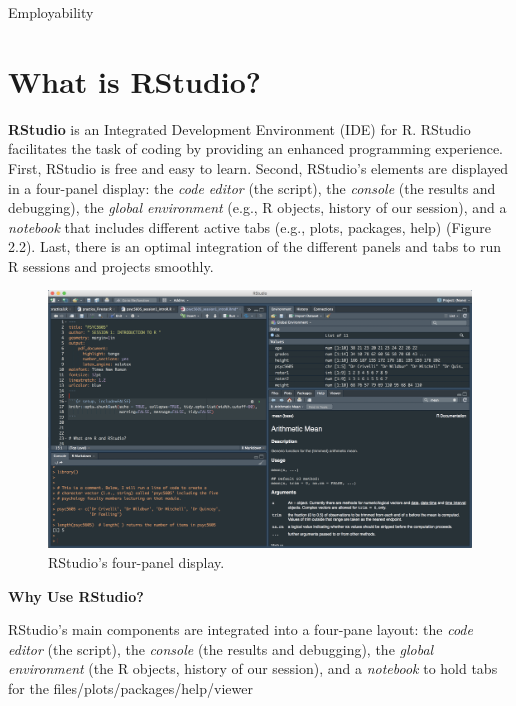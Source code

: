 \documentclass[
]{book}
\theoremstyle{definition}
\theoremstyle{definition}
\theoremstyle{definition}
\theoremstyle{definition}
\theoremstyle{remark}
\begin{document}
Employability

\hypertarget{what-is-rstudio}{%
\section{What is RStudio?}\label{what-is-rstudio}}

\textbf{RStudio} is an Integrated Development Environment (IDE) for R. RStudio facilitates the task of coding by providing an enhanced programming experience. First, RStudio is free and easy to learn. Second, RStudio's elements are displayed in a four-panel display: the \emph{code editor} (the script), the \emph{console} (the results and debugging), the \emph{global environment} (e.g., R objects, history of our session), and a \emph{notebook} that includes different active tabs (e.g., plots, packages, help) (Figure 2.2). Last, there is an optimal integration of the different panels and tabs to run R sessions and projects smoothly.

\begin{figure}

{\centering \includegraphics[width=1\linewidth]{./images/RStudio_panels} 

}

\caption{RStudio's four-panel display.}\label{fig:RStudio}
\end{figure}

\textbf{Why Use RStudio?}

RStudio's main components are integrated into a four-pane layout: the \emph{code editor} (the script), the \emph{console} (the results and debugging), the \emph{global environment} (the R objects, history of our session), and a \emph{notebook} to hold tabs for the files/plots/packages/help/viewer
\end{document}
